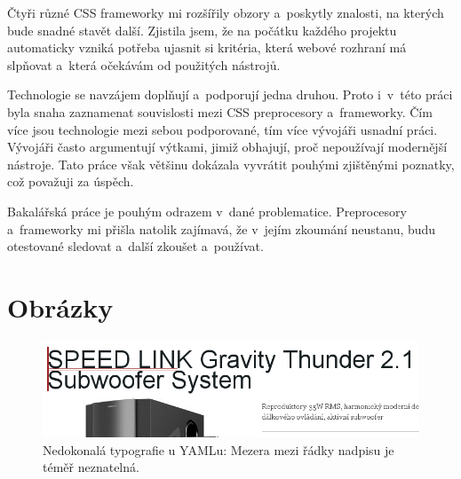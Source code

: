 \documentclass[thesis=B,czech]{FITthesis}[2012/06/26]
\begin{document}
\begin{conclusion}
	Čtyři různé CSS frameworky mi rozšířily obzory a~poskytly znalosti, na kterých bude snadné stavět další. Zjistila jsem, že na počátku každého projektu automaticky vzniká potřeba ujasnit si kritéria, která webové rozhraní má slpňovat a~která očekávám od použitých nástrojů. 

Technologie se navzájem doplňují a~podporují jedna druhou. Proto i~v~této práci byla snaha zaznamenat souvislosti mezi CSS preprocesory a~frameworky. Čím více jsou technologie mezi sebou podporované, tím více vývojáři usnadní práci. Vývojáři často argumentují výtkami, jimiž obhajují, proč nepoužívají modernější nástroje. Tato práce však většinu dokázala vyvrátit pouhými zjištěnými poznatky, což považuji za úspěch. 

Bakalářská práce je pouhým odrazem v~dané problematice. Preprocesory a~frameworky mi přišla natolik zajímavá, že v~jejím zkoumání neustanu, budu otestované sledovat a~další zkoušet a~používat.  

\end{conclusion}




\appendix
\chapter{Obrázky}

\begin{figure}[h]
	\begin{center}
	\includegraphics[scale=0.7]{images/image04.png}
	\end{center}
	\caption[Nedokonalá typografie u YAMLu]{Nedokonalá typografie u YAMLu: Mezera mezi řádky nadpisu je téměř neznatelná.}
	\label{imgTyp}
\end{figure}
\end{document}
